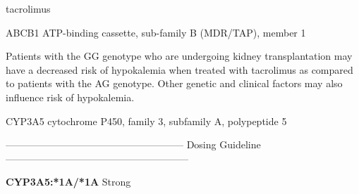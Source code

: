 \documentclass{resume} %
\begin{document}
\begin{rSection}{ tacrolimus }
\begin{rSubsection}{ ABCB1 }{ ATP-binding cassette, sub-family B (MDR/TAP), member 1 }{}{}
\item[] Patients with the GG genotype who are undergoing kidney transplantation may have a decreased risk of hypokalemia when treated with tacrolimus as compared to patients with the AG genotype. Other genetic and clinical factors may also influence risk of hypokalemia.
\end{rSubsection}\begin{rSubsection}{ CYP3A5 }{ cytochrome P450, family 3, subfamily A, polypeptide 5 }{}{}
\item[]
\item[] ------------------------------------------------------ Dosing Guideline --------------------------------------------------------\newline
\item[]
\item[] \textbf{ CYP3A5:*1A/*1A } Strong


\end{rSubsection}
\end{rSection}
\end{document}
